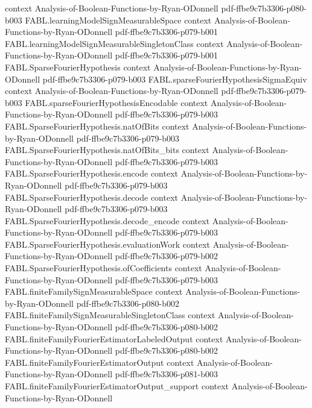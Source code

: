 \begin{theorem}
  {context}
  {Analysis-of-Boolean-Functions-by-Ryan-ODonnell}
  {pdf-ffbe9c7b3306-p080-b003}
\proofstep
  {FABL.learningModelSignMeasurableSpace}
  {context}
  {Analysis-of-Boolean-Functions-by-Ryan-ODonnell}
  {pdf-ffbe9c7b3306-p079-b001}
\proofstep
  {FABL.learningModelSignMeasurableSingletonClass}
  {context}
  {Analysis-of-Boolean-Functions-by-Ryan-ODonnell}
  {pdf-ffbe9c7b3306-p079-b001}
\proofstep
  {FABL.SparseFourierHypothesis}
  {context}
  {Analysis-of-Boolean-Functions-by-Ryan-ODonnell}
  {pdf-ffbe9c7b3306-p079-b003}
\proofstep
  {FABL.sparseFourierHypothesisSigmaEquiv}
  {context}
  {Analysis-of-Boolean-Functions-by-Ryan-ODonnell}
  {pdf-ffbe9c7b3306-p079-b003}
\proofstep
  {FABL.sparseFourierHypothesisEncodable}
  {context}
  {Analysis-of-Boolean-Functions-by-Ryan-ODonnell}
  {pdf-ffbe9c7b3306-p079-b003}
\proofstep
  {FABL.SparseFourierHypothesis.natOfBits}
  {context}
  {Analysis-of-Boolean-Functions-by-Ryan-ODonnell}
  {pdf-ffbe9c7b3306-p079-b003}
\proofstep
  {FABL.SparseFourierHypothesis.natOfBits_bits}
  {context}
  {Analysis-of-Boolean-Functions-by-Ryan-ODonnell}
  {pdf-ffbe9c7b3306-p079-b003}
\proofstep
  {FABL.SparseFourierHypothesis.encode}
  {context}
  {Analysis-of-Boolean-Functions-by-Ryan-ODonnell}
  {pdf-ffbe9c7b3306-p079-b003}
\proofstep
  {FABL.SparseFourierHypothesis.decode}
  {context}
  {Analysis-of-Boolean-Functions-by-Ryan-ODonnell}
  {pdf-ffbe9c7b3306-p079-b003}
\proofstep
  {FABL.SparseFourierHypothesis.decode_encode}
  {context}
  {Analysis-of-Boolean-Functions-by-Ryan-ODonnell}
  {pdf-ffbe9c7b3306-p079-b003}
\proofstep
  {FABL.SparseFourierHypothesis.evaluationWork}
  {context}
  {Analysis-of-Boolean-Functions-by-Ryan-ODonnell}
  {pdf-ffbe9c7b3306-p079-b002}
\proofstep
  {FABL.SparseFourierHypothesis.ofCoefficients}
  {context}
  {Analysis-of-Boolean-Functions-by-Ryan-ODonnell}
  {pdf-ffbe9c7b3306-p079-b003}
\proofstep
  {FABL.finiteFamilySignMeasurableSpace}
  {context}
  {Analysis-of-Boolean-Functions-by-Ryan-ODonnell}
  {pdf-ffbe9c7b3306-p080-b002}
\proofstep
  {FABL.finiteFamilySignMeasurableSingletonClass}
  {context}
  {Analysis-of-Boolean-Functions-by-Ryan-ODonnell}
  {pdf-ffbe9c7b3306-p080-b002}
\proofstep
  {FABL.finiteFamilyFourierEstimatorLabeledOutput}
  {context}
  {Analysis-of-Boolean-Functions-by-Ryan-ODonnell}
  {pdf-ffbe9c7b3306-p080-b002}
\proofstep
  {FABL.finiteFamilyFourierEstimatorOutput}
  {context}
  {Analysis-of-Boolean-Functions-by-Ryan-ODonnell}
  {pdf-ffbe9c7b3306-p081-b003}
\proofstep
  {FABL.finiteFamilyFourierEstimatorOutput_support}
  {context}
  {Analysis-of-Boolean-Functions-by-Ryan-ODonnell}

\end{theorem}
